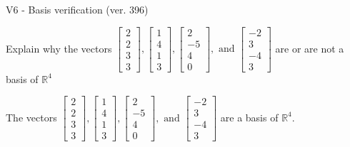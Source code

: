 \begin{exercise}
  \begin{exerciseTitle}V6 - Basis verification (ver. 396)\end{exerciseTitle}
  \begin{exerciseStatement}
    Explain why the vectors \(\left[\begin{array}{r}
2 \\
2 \\
3 \\
3
\end{array}\right] , \left[\begin{array}{r}
1 \\
4 \\
1 \\
3
\end{array}\right] , \left[\begin{array}{r}
2 \\
-5 \\
4 \\
0
\end{array}\right] , \text{ and } \left[\begin{array}{r}
-2 \\
3 \\
-4 \\
3
\end{array}\right]\) are or are not a basis of \(\mathbb{R}^4\)	


  \end{exerciseStatement}
  \begin{exerciseAnswer}
   The vectors \(\left[\begin{array}{r}
2 \\
2 \\
3 \\
3
\end{array}\right] , \left[\begin{array}{r}
1 \\
4 \\
1 \\
3
\end{array}\right] , \left[\begin{array}{r}
2 \\
-5 \\
4 \\
0
\end{array}\right] , \text{ and } \left[\begin{array}{r}
-2 \\
3 \\
-4 \\
3
\end{array}\right]\) 
  	 are  a basis of \(\mathbb{R}^4\).
  


  \end{exerciseAnswer}
\end{exercise}